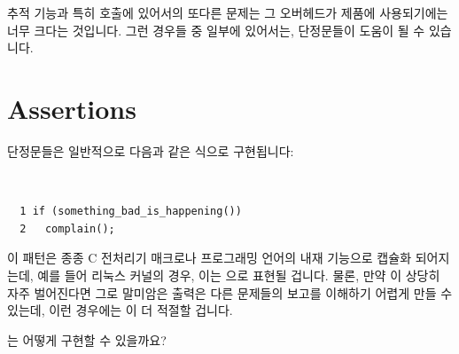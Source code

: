 추적 기능과 특히  호출에 있어서의 또다른 문제는 그 오버헤드가
제품에 사용되기에는 너무 크다는 것입니다.
그런 경우들 중 일부에 있어서는, 단정문들이 도움이 될 수 있습니다.

\section{Assertions}
\label{sec:debugging:Assertions}

단정문들은 일반적으로 다음과 같은 식으로 구현됩니다:

\vspace{5pt}
\begin{minipage}[t]{\columnwidth}
\tt
\scriptsize
\begin{verbatim}
  1 if (something_bad_is_happening())
  2   complain();
\end{verbatim}
\end{minipage}
\vspace{5pt}

이 패턴은 종종 C 전처리기 매크로나 프로그래밍 언어의 내재 기능으로 캡슐화
되어지는데, 예를 들어 리눅스 커널의 경우, 이는
 으로 표현될 겁니다.
물론, 만약  이 상당히 자주 벌어진다면 그로
말미암은 출력은 다른 문제들의 보고를 이해하기 어렵게 만들 수 있는데, 이런
경우에는  이 더 적절할 겁니다.

\QuickQuiz{}
	 는 어떻게 구현할 수 있을까요?
	\iffalse

